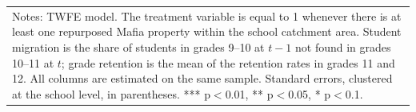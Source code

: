 \documentclass[12pt]{article}
\theoremstyle{plain}
\theoremstyle{plain}
\theoremstyle{plain}
\theoremstyle{definition}
\theoremstyle{plain}
\theoremstyle{definition}
\theoremstyle{plain}
\theoremstyle{remark}
\theoremstyle{definition}
\theoremstyle{definition}
\theoremstyle{plain}
\begin{document}
\begin{table}[H]
{\begin{tabular}{p{7.39em}llll}
    \midrule
    \multicolumn{5}{p{27.39em}}{Notes: TWFE model. The treatment variable is equal to 1 whenever there is at least one repurposed Mafia property within the school catchment area. Student migration is the share of students in grades 9--10 at $t-1$ not found in grades 10--11 at $t$; grade retention is the mean of the retention rates in grades 11 and 12. All columns are estimated on the same sample. Standard errors, clustered at the school level, in parentheses. *** p$<$0.01, ** p$<$0.05, * p$<$0.1.} \\
    \end{tabular}%
}
\end{table}


 \begin{table}[H]
\caption{Effect of the treatment on selection in enrollment preferences.}
\label{tab:jmp_enrollment_selection}
\vspace{0.2cm}
\centering
{}
\end{table}
\end{document}
